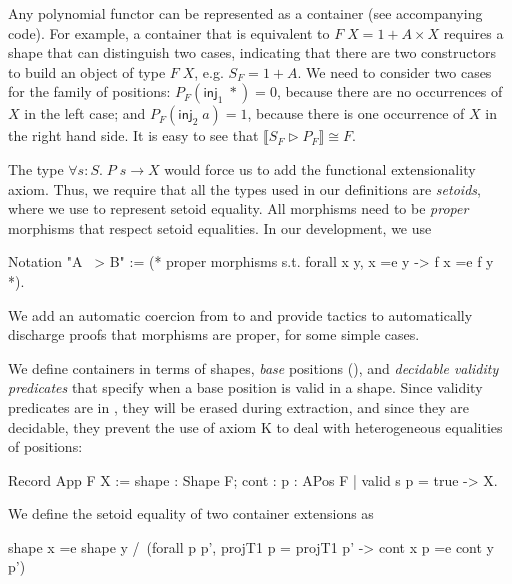 \documentclass[a4paper,anonymous, UKenglish,cleveref, autoref, thm-restate]{lipics-v2021}
\begin{document}
Any polynomial functor can be represented as a container (see accompanying
code).  For example, a container that is equivalent to $F\; X = 1 + A \times X$
requires a shape that can distinguish two cases, indicating that there are two
constructors to build an object of type $F\;X$, e.g. $S_{F} = 1 + A$. We need to
consider two cases for the family of positions:
$P_{F}(\mathsf{inj}_{1}\;*) = 0$, because there are no occurrences of $X$ in the
left case; and $P_{F}(\mathsf{inj}_{2}\;a) = 1$, because there is one occurrence
of $X$ in the right hand side. It is easy to see that
$\llbracket S_{F} \triangleright P_{F} \rrbracket \cong F$.

The type $\forall s : S.\; P\;s \to X$ would force us to add
the functional extensionality axiom. Thus, we require that all the types used in
our definitions are \emph{setoids}, where we use  to represent
setoid equality. All morphisms need to be \emph{proper} morphisms that respect
setoid equalities. In our development, we use
\begin{coqcode}
Notation "A ~> B" := (* proper morphisms  s.t. forall x y, x =e y -> f x =e f y *).
\end{coqcode}
We add an automatic coercion from  to  and provide
tactics to automatically discharge proofs that morphisms are proper,  for some
simple cases.

We define containers in terms of shapes, \emph{base} positions
(), and \emph{decidable validity predicates} that specify when a
base position is valid in a shape. Since validity predicates are in ,
they will be erased during extraction, and since they are decidable, they
prevent the use of axiom K to deal with heterogeneous equalities of positions:
\begin{coqcode}
Record App F X := {shape : Shape F; cont : {p : APos F | valid s p = true} -> X}.
\end{coqcode}

We define the setoid equality of two container extensions  as
\begin{coqcode}
shape x =e shape y /\ (forall p p', projT1 p = projT1 p' -> cont x p =e cont y p')
\end{coqcode}
\end{document}
